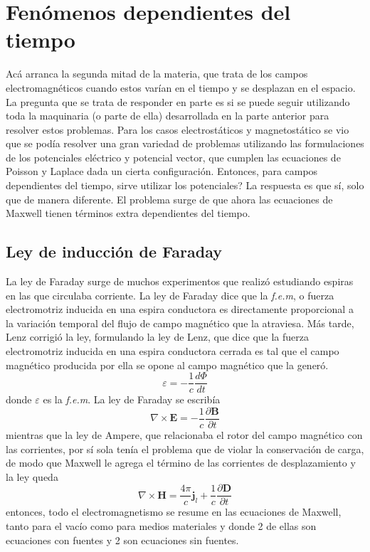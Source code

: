 
\newpage
\section{Fenómenos dependientes del tiempo}
Acá arranca la segunda mitad de la materia, que trata de los campos electromagnéticos cuando estos varían en el tiempo y se desplazan en el espacio. La pregunta que se trata de responder en parte es si se puede seguir utilizando toda la maquinaria (o parte de ella) desarrollada en la parte anterior para resolver estos problemas. Para los casos electrostáticos y magnetostático se vio que se podía resolver una gran variedad de problemas utilizando las formulaciones de los potenciales eléctrico y potencial vector, que cumplen las ecuaciones de Poisson y Laplace dada un cierta configuración. Entonces, para campos dependientes del tiempo, sirve utilizar los potenciales? La respuesta es que sí, solo que de manera diferente. El problema surge de que ahora las ecuaciones de Maxwell tienen términos extra dependientes del tiempo.

\subsection{Ley de inducción de Faraday}
La ley de Faraday surge de muchos experimentos que realizó estudiando espiras en las que circulaba corriente. La ley de Faraday dice que la \textit{f.e.m}, o fuerza electromotriz inducida en una espira conductora es directamente proporcional a la variación temporal del flujo de campo magnético que la atraviesa. Más tarde, Lenz corrigió la ley, formulando la ley de Lenz, que dice que la fuerza electromotriz inducida en una espira conductora cerrada es tal que el campo magnético producida por ella se opone al campo magnético que la generó.
\begin{equation*}
    \varepsilon = -\frac{1}{c}\frac{d \Phi}{dt}
\end{equation*}
donde $\varepsilon$ es la \textit{f.e.m}. La ley de Faraday se escribía
\begin{equation*}
    \nabla \times \textbf{E} = -\frac{1}{c}\frac{\partial \textbf{B}}{\partial t}
\end{equation*}
mientras que la ley de Ampere, que relacionaba el rotor del campo magnético con las corrientes, por sí sola tenía el problema que de violar la conservación de carga, de modo que Maxwell le agrega el término de las corrientes de desplazamiento y la ley queda
\begin{equation*}
    \nabla \times \textbf{H} = 
    \frac{4\pi}{c}\textbf{j}_{l} 
    + \frac{1}{c}\frac{\partial \textbf{D}}{\partial t}
\end{equation*}
entonces, todo el electromagnetismo se resume en las ecuaciones de Maxwell, tanto para el vacío como para medios materiales y donde 2 de ellas son ecuaciones con fuentes y 2 son ecuaciones sin fuentes.

